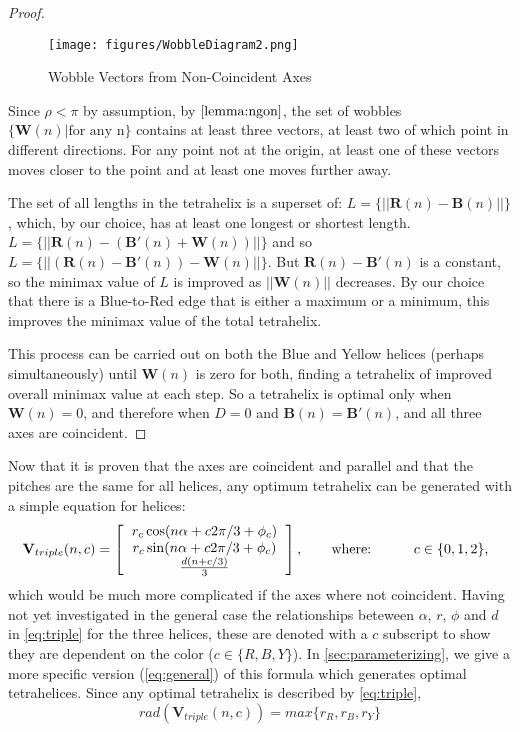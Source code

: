\documentclass[10pt,final]{journals-1.0/asme2ej}
\renewcommand{\vec}[1]{\mathbf{#1}}
\begin{document}
\begin{proof}
  \begin{figure}
     \centering
     \texttt{[image: figures/WobbleDiagram2.png]}
     \caption{Wobble Vectors from Non-Coincident Axes}
  \label{fig:wobble}
\end{figure}

  Since $\rho < \pi$ by assumption, by $\cref{lemma:ngon}$,
  the set of wobbles $\{\vec{W}(n) | \text{for any n}\}$
  contains at least three vectors,
  at least two of which point in different directions.
  For any point not at the origin, at least one of these vectors moves closer to the
  point and at least one moves further away.

    The set of all lengths in the tetrahelix is a superset of:
    $L = \{|| \vec{R}(n) - \vec{B}(n)||\}$, which, by our choice,
    has at least one longest or shortest
    length.
    $L = \{|| \vec{R}(n) - (\vec{B'}(n) + \vec{W}(n))||\}$ and so
    $L = \{|| (\vec{R}(n) - \vec{B'}(n)) - \vec{W}(n)||\}$.
    But $\vec{R}(n) - \vec{B'}(n)$ is a constant, so the minimax value of $L$ is improved as $||\vec{W}(n)||$
    decreases.  
    By our choice that there is a Blue-to-Red edge that is either a maximum or a minimum,
    this improves the minimax value of the total tetrahelix.
    
    This process can be carried out on both the Blue and Yellow helices
    (perhaps simultaneously) until $\vec{W}(n)$ is
    zero for both, finding a tetrahelix of improved overall minimax value at each step.
    So a tetrahelix is optimal only when $\vec{W}(n) = 0$, and therefore when $D=0$ and
    $\vec{B}(n) = \vec{B'}(n)$, and all three axes are coincident.
\end{proof}

Now that it is proven that the axes are coincident and parallel and that the pitches
are the same for all helices, any optimum tetrahelix can
be generated with a simple equation for helices:
\begin{equation}
\label{eq:triple}
\vec{V}_{triple}(n,c) =
\left [
  \begin{tabular}{c}
   $ r_c \cos(n \alpha +  c 2 \pi /3 + \phi_c)$\\
   $ r_c \sin(n \alpha +  c 2 \pi /3 + \phi_c) $\\
   $ \frac{d(n +c / 3)}{3}   $
  \end{tabular}
  \right ],
\text{\qquad where: \qquad}
\begin{tabular}{l}
  $c \in \{0,1,2\}$,
\end{tabular}
\end{equation}
which would be much more complicated if the axes where not coincident.
Having not yet investigated in the general case the relationships beteween
$\alpha$, $r$, $\phi$ and $d$ in \cref{eq:triple} for the three helices,
 these are denoted with a $c$ subscript to show
they are dependent on the color ($c \in \{R,B,Y\}$).
In \cref{sec:parameterizing}, we give a more specific version (\cref{eq:general}) of this formula which
generates optimal tetrahelices.
Since any optimal tetrahelix is described by \cref{eq:triple},
\[
rad(\vec{V}_{triple}(n,c)) = max \{r_R, r_B, r_Y\}
\]
\end{document}
